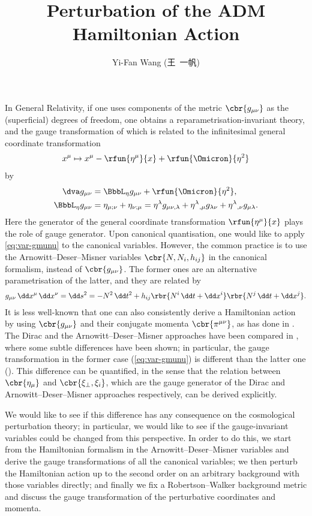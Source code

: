 \documentclass[a4paper,11pt]{article}
\title{Perturbation of the ADM Hamiltonian Action}
\author{Yi-Fan Wang (王\ 一帆)}
\begin{document}
\maketitle

In General Relativity, if one uses components of the metric $\cbr{g_{\mu\nu}}$ 
as the (superficial) degrees of freedom, one obtains a 
reparametrisation-invariant theory, and the gauge transformation of which is 
related to the infinitesimal general coordinate transformation
\begin{align}
x^\mu \mapsto x^\mu - \rfun{\eta^\mu}{x} +
\rfun{\Omicron}{\eta^2}
\end{align}
by
\begin{align}
\dva g_{\mu\nu} &= \BbbL_\eta g_{\mu\nu} + \rfun{\Omicron}{\eta^2},
\\
\BbbL_\eta g_{\mu\nu} &= \eta_{\mu;\nu} + \eta_{\nu;\mu}
= \eta^\lambda g_{\mu\nu,\lambda} + 
\eta^{\lambda}{}_{,\mu} g_{\lambda\nu} +
\eta^{\lambda}{}_{,\nu} g_{\mu\lambda}.
\label{eq:var-gmunu}
\end{align}
Here the generator of the general coordinate transformation 
$\rfun{\eta^\mu}{x}$ plays the role of gauge generator. Upon canonical 
quantisation, one would like to apply \cref{eq:var-gmunu} to the canonical 
variables. However, the common practice is to use the Arnowitt--Deser--Misner 
variables $\cbr{N, N_i, h_{ij}}$ in the canonical formalism, instead of 
$\cbr{g_{\mu\nu}}$. The former ones are an alternative parametrisation of the 
latter, and they are related by
\begin{align}
g_{\mu\nu}\,\dd x^\mu\,\dd x^\nu = \dd s^2 = -N^2\,\dd t^2 + h_{ij}
\rbr{N^i\,\dd t + \dd x^i}\rbr{N^j\,\dd t + \dd x^j}.
\end{align}
It is less well-known that one can also consistently derive a Hamiltonian 
action by using $\cbr{g_{\mu\nu}}$ and their conjugate momenta 
$\cbr{\pi^{\mu\nu}}$, as \citeauthor{Dirac1958} has done in \cite{Dirac1958}. 
The Dirac and the Arnowitt--Deser--Misner approaches have been compared in 
\cite{Kiriushcheva2008}, where some subtle differences have been shown; in 
particular, the gauge transformation in the former case (\cref{eq:var-gmunu}) 
is different than the latter one (). This 
difference can be quantified, in the sense that the relation between 
$\cbr{\eta_\mu}$ and $\cbr{\xi_\perp, \xi_i}$, which are the gauge generator of 
the Dirac and Arnowitt--Deser--Misner approaches respectively, can be derived 
explicitly.

We would like to see if this difference has any consequence on the cosmological 
perturbation theory; in particular, we would like to see if the gauge-invariant 
variables could be changed from this perspective. In order to do this, we start 
from the Hamiltonian formalism in the Arnowitt--Deser--Misner variables and 
derive the gauge transformations of all the canonical variables; we then perturb 
the Hamiltonian action up to the second order on an arbitrary background with 
those variables directly; and finally we fix a Robertson--Walker background 
metric and discuss the gauge transformation of the perturbative coordinates and 
momenta.
\end{document}
